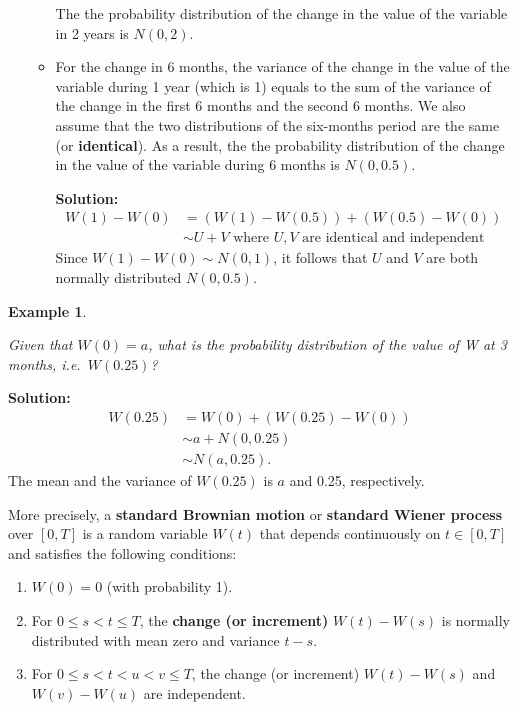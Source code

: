 \documentclass[landscape, 20pt]{extreport}
\theoremstyle{definition}
\theoremstyle{definition}
\newtheorem{example}{Example}[chapter]
\theoremstyle{definition}
\theoremstyle{definition}
\theoremstyle{remark}
\begin{document}
\begin{itemize}
\begin{itemize}
    The the probability distribution of the change in the value of
    the variable in 2 years is \(N(0,2)\).
  \item
    For the change in 6 months, the variance of the change in the
    value of the variable during 1 year (which is 1) equals to the
    sum of the variance of the change in the first 6 months and the
    second 6 months. We also assume that the two distributions of
    the six-months period are the same (or \textbf{identical}). As a
    result, the the probability distribution of the change in the
    value of the variable during 6 months is \(N(0,0.5)\).

    \textbf{Solution:} \[\begin{aligned}
        W(1) - W(0) &= (W(1) - W(0.5)) +  (W(0.5) - W(0)) \\
                  &\sim U + V \text{ where } U, V \text{ are identical and independent}\end{aligned}\]
    Since \(W(1) - W(0) \sim N(0,1)\), it follows that \(U\) and \(V\) are
    both normally distributed \(N(0,0.5)\).
  \end{itemize}
\end{itemize}

\newpage \begin{example}
\protect\hypertarget{exm:unlabeled-div-67}{}\label{exm:unlabeled-div-67}

\emph{Given that \(W(0) = a\), what is the probability
distribution of the value of W at 3 months, i.e.~\(W(0.25)\)?}

\end{example}

\textbf{Solution:} \[\begin{aligned}
    W(0.25) &= W(0) + (W(0.25) - W(0)) \\
            & \sim a + N(0,0.25)  \\
            & \sim N(a, 0.25).\end{aligned}\] The mean and the variance
of \(W(0.25)\) is \(a\) and 0.25, respectively.

More precisely, a \textbf{standard Brownian motion} or \textbf{standard Wiener
process} over \([0,T]\) is a random variable \(W(t)\) that depends
continuously on \(t \in [0,T]\) and satisfies the following conditions:

\begin{enumerate}
\def\labelenumi{\arabic{enumi}.}
\item
  \(W(0) = 0\) (with probability 1).
\item
  For \(0 \le s < t \le T\), the \textbf{change (or increment)} \(W(t) - W(s)\)
  is normally distributed with mean zero and variance \(t -s\).
\item
  For \(0 \le s < t < u < v \le T\), the change (or increment)
  \(W(t) - W(s)\) and \(W(v) - W(u)\) are independent.
\end{enumerate}
\end{document}
